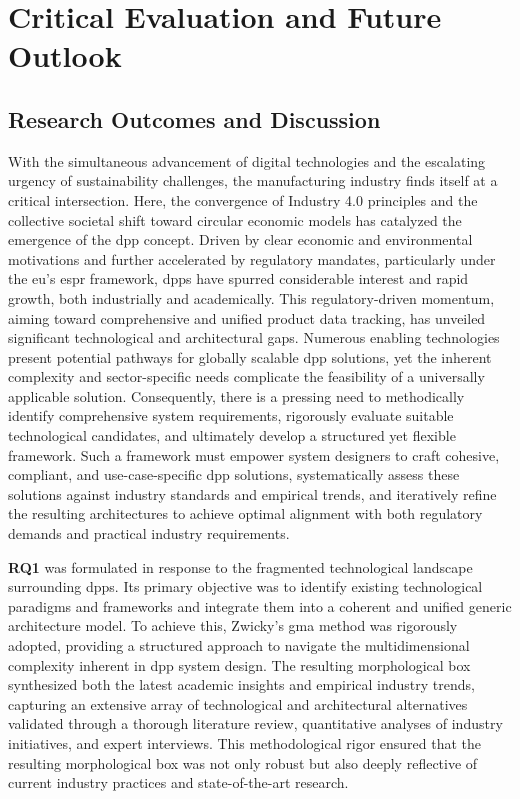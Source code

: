 \chapter{Critical Evaluation and Future Outlook}
\label{cha:chapter_6}

\section{Research Outcomes and Discussion}

With the simultaneous advancement of digital technologies and the escalating urgency of sustainability challenges, the manufacturing industry finds itself at a critical intersection. Here, the convergence of Industry 4.0 principles and the collective societal shift toward circular economic models has catalyzed the emergence of the \acrlong{dpp} concept. Driven by clear economic and environmental motivations and further accelerated by regulatory mandates, particularly under the \ac{eu}’s \ac{espr} framework, \ac{dpp}s have spurred considerable interest and rapid growth, both industrially and academically. This regulatory-driven momentum, aiming toward comprehensive and unified product data tracking, has unveiled significant technological and architectural gaps. Numerous enabling technologies present potential pathways for globally scalable \ac{dpp} solutions, yet the inherent complexity and sector-specific needs complicate the feasibility of a universally applicable solution. Consequently, there is a pressing need to methodically identify comprehensive system requirements, rigorously evaluate suitable technological candidates, and ultimately develop a structured yet flexible framework. Such a framework must empower system designers to craft cohesive, compliant, and use-case-specific \ac{dpp} solutions, systematically assess these solutions against industry standards and empirical trends, and iteratively refine the resulting architectures to achieve optimal alignment with both regulatory demands and practical industry requirements.

\textbf{RQ1} was formulated in response to the fragmented technological landscape surrounding \ac{dpp}s. Its primary objective was to identify existing technological paradigms and frameworks and integrate them into a coherent and unified generic architecture model. To achieve this, Zwicky’s \acrlong{gma} method was rigorously adopted, providing a structured approach to navigate the multidimensional complexity inherent in \ac{dpp} system design. The resulting morphological box synthesized both the latest academic insights and empirical industry trends, capturing an extensive array of technological and architectural alternatives validated through a thorough literature review, quantitative analyses of industry initiatives, and expert interviews. This methodological rigor ensured that the resulting morphological box was not only robust but also deeply reflective of current industry practices and state-of-the-art research.

